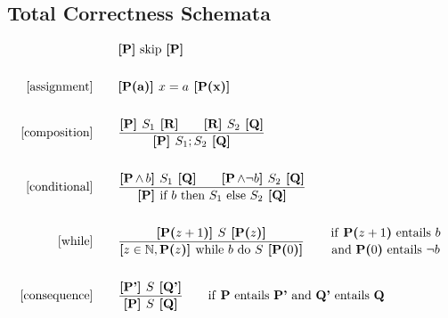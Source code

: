 \documentclass[a4paper, 12pt, twoside]{article}
\newcommand*{\bfrac}[2]{\genfrac{}{}{0pt}{}{#1}{#2}}
\begin{document}
\subsection{Total Correctness Schemata}

\begin{align*}
  [\text{skip}]& \qquad \textbf{[P]} \text{ skip } \textbf{[P]} \\ \\
  [\text{assignment}]& \qquad \textbf{[P(a)] } x = a \textbf{ [P(x)]} \\ \\
  [\text{composition}]& \qquad \frac{
    \textbf{[P] } S_1 \textbf{ [R]} \qquad
    \textbf{[R] } S_2 \textbf{ [Q]}
  }{
    \textbf{[P] } S_1; S_2 \textbf{ [Q]}
  } \\ \\
  [\text{conditional}]& \qquad \frac{
    \textbf{[P$\, \land \, b$] } S_1 \textbf{ [Q]} \qquad
    \textbf{[P$\, \land \neg b$] } S_2 \textbf{ [Q]}
  }{
    \textbf{[P] } \text{if } b \text{ then } S_1 \text{ else } S_2 \textbf{ [Q]}
  } \\ \\
  [\text{while}]& \qquad \frac{
    \textbf{[P($z + 1$)] } S \textbf{ [P($z$)]}
  }{
    \textbf{[$z \in \mathbb{N}, \, $P($z$)] } \text{while } b \text{ do } S \textbf{ [P($0$)]}
  } \qquad \bfrac{\text{if \textbf{P($z + 1$)} entails $b$}}{
    \text{and \textbf{P($0$)} entails $\neg b$}} \\ \\
  [\text{consequence}]& \qquad \frac{
    \textbf{[P'] } S \textbf{ [Q']}
  }{
    \textbf{[P] } S \textbf{ [Q]}
  } \qquad \text{if \textbf{P} entails \textbf{P'} and \textbf{Q'} entails \textbf{Q}} 
\end{align*}
\end{document}
